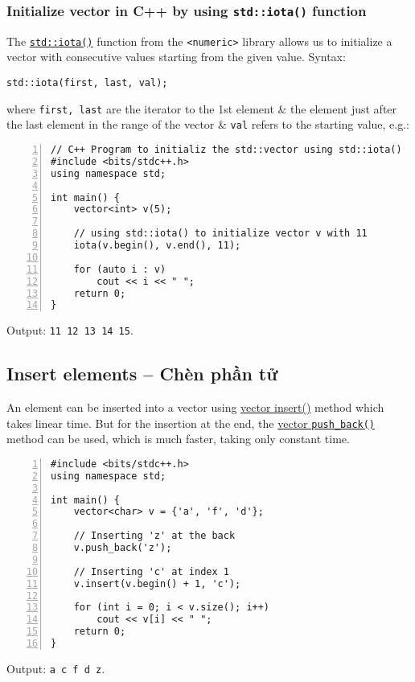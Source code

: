 \documentclass{article}
\begin{document}
\subsubsection{Initialize vector in C++ by using {\tt std::iota()} function}
The \href{https://www.geeksforgeeks.org/std-iota-in-cpp/}{\tt std::iota()} function from the {\tt<numeric>} library allows us to initialize a vector with consecutive values starting from the given value. Syntax:
\begin{verbatim}
std::iota(first, last, val);
\end{verbatim}
where {\tt first, last} are the iterator to the 1st element \& the element just after the last element in the range of the vector \& {\tt val} refers to the starting value, e.g.:
\begin{Verbatim}[numbers=left,xleftmargin=5mm]
// C++ Program to initializ the std::vector using std::iota()
#include <bits/stdc++.h>
using namespace std;

int main() {
    vector<int> v(5);
	
	// using std::iota() to initialize vector v with 11
    iota(v.begin(), v.end(), 11);
	
    for (auto i : v)
        cout << i << " ";
    return 0;
}
\end{Verbatim}
Output: {\tt11 12 13 14 15}.


\subsection{Insert elements -- Chèn phần tử}
An element can be inserted into a vector using \href{https://www.geeksforgeeks.org/vector-insert-function-in-cpp-stl}{vector insert()} method which takes linear time. But for the insertion at the end, the \href{https://www.geeksforgeeks.org/vectorpush_back-vectorpop_back-c-stl/}{vector {\tt push\_back()}} method can be used, which is much faster, taking only constant time.
\begin{Verbatim}[numbers=left,xleftmargin=5mm]
#include <bits/stdc++.h>
using namespace std;

int main() {
    vector<char> v = {'a', 'f', 'd'};
	
    // Inserting 'z' at the back
    v.push_back('z');
	
    // Inserting 'c' at index 1
    v.insert(v.begin() + 1, 'c');
	
    for (int i = 0; i < v.size(); i++)
        cout << v[i] << " ";
    return 0;
}
\end{Verbatim}
Output: {\tt a c f d z}.
\end{document}
